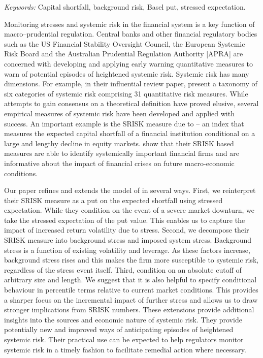 \documentclass[12pt]{article}
\begin{document}
\noindent%
{\it Keywords:}  Capital shortfall, background risk, Basel put, stressed expectation.
\vfill

\newpage
{} %

Monitoring stresses and systemic risk in the financial system is a key function of macro--prudential regulation. Central banks and other financial regulatory bodies such as the US Financial Stability Oversight Council, the European Systemic Risk Board and the Australian Prudential Regulation Authority [APRA] are concerned with developing and applying early warning quantitative  measures  to warn of potential episodes of heightened systemic risk. Systemic risk has many dimensions. For example, in their influential review paper, \cite{Bisias2012} present a taxonomy of six categories of systemic risk comprising 31 quantitative risk measures. While attempts to gain consensus on a theoretical definition have proved elusive, several empirical measures of systemic risk have been developed and applied with  success.  An important example is the SRISK measure due to \cite{brownlees2015} -- an index that measures the expected capital shortfall of a financial institution conditional on a large and lengthy decline in equity markets. \cite{brownlees2015} show that their SRISK based measures are able to identify systemically important financial firms and are informative about the impact of financial crises on future macro-economic conditions. 

Our paper refines and extends the model of \cite{brownlees2015} in several  ways. First, we reinterpret their SRISK measure as a put on the expected shortfall using stressed expectation. While they condition on the event of a severe market downturn, we take the stressed expectation of the put value. This enables us to capture the impact of increased return volatility due to stress. Second, we decompose their SRISK measure into background stress and imposed system stress. Background stress is a function of existing volatility and leverage. As these factors increase, background stress rises and this makes the firm more susceptible to systemic risk, regardless of the stress event itself. Third,    
\cite{brownlees2015} condition on an absolute cutoff of arbitrary size and length. We suggest that it is also helpful to specify conditional behaviour in percentile terms relative to current market conditions. This provides a sharper focus on the incremental impact of further stress and allows us to draw stronger implications from SRISK numbers. These extensions provide additional insights into the sources and economic nature of systemic risk. They provide potentially new and improved ways of anticipating episodes of heightened systemic risk. Their practical use can be expected to help regulators monitor systemic risk in a timely fashion to facilitate remedial action where necessary.
\end{document}
